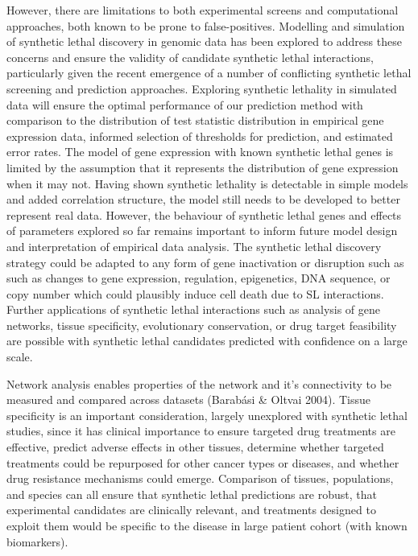 However, there are limitations to both experimental screens and computational approaches, both known to be prone to false-positives.  Modelling and simulation of synthetic lethal discovery in genomic data has been explored to address these concerns and ensure the validity of candidate synthetic lethal interactions, particularly given the recent emergence of a number of conflicting synthetic lethal screening and prediction approaches.  Exploring synthetic lethality in simulated data will ensure the optimal performance of our prediction method with comparison to the distribution of test statistic distribution in empirical gene expression data, informed selection of thresholds for prediction, and estimated error rates.  The model of gene expression with known synthetic lethal genes is limited by the assumption that it represents the distribution of gene expression when it may not.  Having shown synthetic lethality is detectable in simple models and added correlation structure, the model still needs to be developed to better represent real data.  However, the behaviour of synthetic lethal genes and effects of parameters explored so far remains important to inform future model design and interpretation of empirical data analysis.
The synthetic lethal discovery strategy could be adapted to any form of gene inactivation or disruption such as such as changes to gene expression, regulation, epigenetics, DNA sequence, or copy number which could plausibly induce cell death due to SL interactions.  Further applications of synthetic lethal interactions such as analysis of gene networks, tissue specificity, evolutionary conservation, or drug target feasibility are possible with synthetic lethal candidates predicted with confidence on a large scale.

Network analysis enables properties of the network and it’s connectivity to be measured and compared across datasets (Barabási \& Oltvai 2004).  Tissue specificity is an important consideration, largely unexplored with synthetic lethal studies, since it has clinical importance to ensure targeted drug treatments are effective, predict adverse effects in other tissues, determine whether targeted treatments could be repurposed for other cancer types or diseases, and whether drug resistance mechanisms could emerge.  Comparison of tissues, populations, and species can all ensure that synthetic lethal predictions are robust, that experimental candidates are clinically relevant, and treatments designed to exploit them would be specific to the disease in large patient cohort (with known biomarkers).

